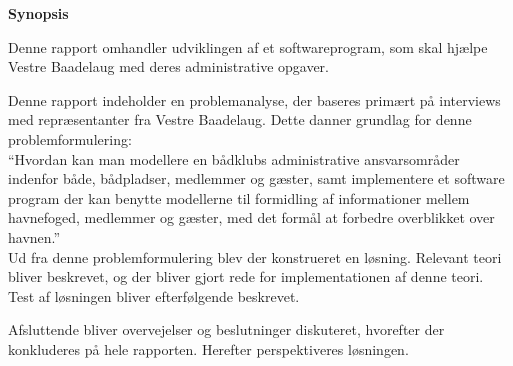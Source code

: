 \begin{center}\textbf{Synopsis}\\ \end{center}

Denne rapport omhandler udviklingen af et softwareprogram, som skal hjælpe Vestre Baadelaug med deres administrative opgaver.

Denne rapport indeholder en problemanalyse, der baseres primært på interviews med repræsentanter fra Vestre Baadelaug. Dette danner grundlag for denne problemformulering:\\

\enquote{Hvordan kan man modellere en bådklubs administrative ansvarsområder indenfor både, bådpladser, medlemmer og gæster, samt implementere et software program der kan benytte modellerne til formidling af informationer mellem havnefoged, medlemmer og gæster, med det formål at forbedre overblikket over havnen.}\\
	
Ud fra denne problemformulering blev der konstrueret en løsning. Relevant teori bliver beskrevet, og der bliver gjort rede for implementationen af denne teori. Test af løsningen bliver efterfølgende beskrevet.

Afsluttende bliver overvejelser og beslutninger diskuteret, hvorefter der konkluderes på hele rapporten. Herefter perspektiveres løsningen.



